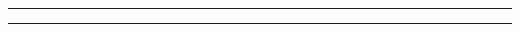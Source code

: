 \documentclass{wmu/wmu-thesis}
\begin{document}
\singlespace
{}
\noindent\rule{\textwidth}{1pt}
\doublespace
{}
\noindent\rule{\textwidth}{1pt}
\begin{spacing}{2}
\end{spacing}
\end{document}
